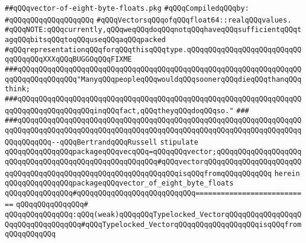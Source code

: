 \label{src/lib/std/src/vector-of-eight-byte-floats.pkg}
\verb|##qQQqvector-of-eight-byte-floats.pkg|\newline
\newline
\verb|#qQQqCompiledqQQqby:|\newline
\verb|#qQQqqQQqqQQqqQQqqQQq|\newline
\newline
\verb|#qQQqVectorsqQQqofqQQqfloat64::realqQQqvalues.|\newline
\verb|#qQQqNOTE:qQQqcurrently,qQQqweqQQqdoqQQqnotqQQqhaveqQQqsufficientqQQqtagqQQqbitsqQQqtoqQQquseqQQqaqQQqpacked|\newline
\verb|#qQQqrepresentationqQQqforqQQqthisqQQqtype.qQQqqQQqqQQqqQQqqQQqqQQqqQQqqQQqqQQqXXXqQQqBUGGOqQQqFIXME|\newline
\newline
\verb|###qQQqqQQqqQQqqQQqqQQqqQQqqQQqqQQqqQQqqQQqqQQqqQQqqQQqqQQqqQQqqQQqqQQqqQQqqQQqqQQqqQQq"ManyqQQqpeopleqQQqwouldqQQqsoonerqQQqdieqQQqthanqQQqthink;|\newline
\verb|###qQQqqQQqqQQqqQQqqQQqqQQqqQQqqQQqqQQqqQQqqQQqqQQqqQQqqQQqqQQqqQQqqQQqqQQqqQQqqQQqqQQqqQQqinqQQqfact,qQQqtheyqQQqdoqQQqso."|\newline
\verb|###|\newline
\verb|###qQQqqQQqqQQqqQQqqQQqqQQqqQQqqQQqqQQqqQQqqQQqqQQqqQQqqQQqqQQqqQQqqQQqqQQqqQQqqQQqqQQqqQQqqQQqqQQqqQQqqQQqqQQqqQQqqQQqqQQqqQQqqQQqqQQqqQQqqQQqqQQqqQQq--qQQqBertrandqQQqRussell|\newline
\newline
\newline
\newline
\verb|stipulate|\newline
\verb|qQQqqQQqqQQqqQQqpackageqQQqvecqQQq=qQQqqQQqvector;qQQqqQQqqQQqqQQqqQQqqQQqqQQqqQQqqQQqqQQqqQQqqQQqqQQqqQQq#qQQqvectorqQQqqQQqqQQqqQQqqQQqqQQqqQQqqQQqqQQqqQQqqQQqqQQqqQQqqQQqqQQqqQQqisqQQqfromqQQqqQQqqQQq|\newline
\verb|herein|\newline
\newline
\verb|qQQqqQQqqQQqqQQqpackageqQQqvector_of_eight_byte_floats|\newline
\verb|qQQqqQQqqQQqqQQq#qQQqqQQqqQQqqQQqqQQqqQQqqQQq===========================|\newline
\verb|qQQqqQQqqQQqqQQq#|\newline
\verb|qQQqqQQqqQQqqQQq:qQQq(weak)qQQqqQQqTypelocked_VectorqQQqqQQqqQQqqQQqqQQqqQQqqQQqqQQqqQQq#qQQqTypelocked_VectorqQQqqQQqqQQqqQQqqQQqisqQQqfromqQQqqQQqqQQq|\newline
